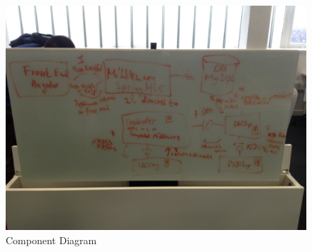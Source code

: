 \begin{figure}
\begin{center}
\includegraphics[width=18cm]{figures/component}
\end{center}
\caption{Component Diagram}
\label{fig:component}
\end{figure}